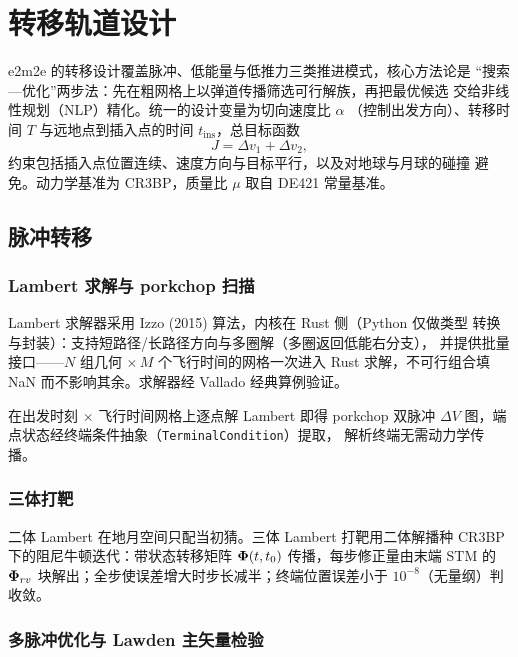 \section{转移轨道设计}
\label{sec:transfer}

e2m2e 的转移设计覆盖脉冲、低能量与低推力三类推进模式，核心方法论是
“搜索—优化”两步法：先在粗网格上以弹道传播筛选可行解族，再把最优候选
交给非线性规划（NLP）精化。统一的设计变量为切向速度比 $\alpha$
（控制出发方向）、转移时间 $T$ 与远地点到插入点的时间
$t_{\mathrm{ins}}$，总目标函数
\begin{equation}
  J = \Delta v_1 + \Delta v_2 ,
\end{equation}
约束包括插入点位置连续、速度方向与目标平行，以及对地球与月球的碰撞
避免。动力学基准为 CR3BP，质量比 $\mu$ 取自 DE421 常量基准。

\subsection{脉冲转移}

\subsubsection{Lambert 求解与 porkchop 扫描}

Lambert 求解器采用 Izzo (2015) 算法，内核在 Rust 侧（Python 仅做类型
转换与封装）：支持短路径/长路径方向与多圈解（多圈返回低能右分支），
并提供批量接口——$N$ 组几何 $\times\,M$ 个飞行时间的网格一次进入 Rust
求解，不可行组合填 NaN 而不影响其余。求解器经 Vallado 经典算例验证。

在出发时刻 $\times$ 飞行时间网格上逐点解 Lambert 即得 porkchop 双脉冲
$\Delta V$ 图，端点状态经终端条件抽象（\texttt{TerminalCondition}）提取，
解析终端无需动力学传播。

\subsubsection{三体打靶}

二体 Lambert 在地月空间只配当初猜。三体 Lambert 打靶用二体解播种 CR3BP
下的阻尼牛顿迭代：带状态转移矩阵 $\bm{\Phi}(t, t_0)$ 传播，每步修正量由末端
STM 的 $\bm{\Phi}_{rv}$ 块解出；全步使误差增大时步长减半；终端位置误差小于
$10^{-8}$（无量纲）判收敛。

\subsubsection{多脉冲优化与 Lawden 主矢量检验}


